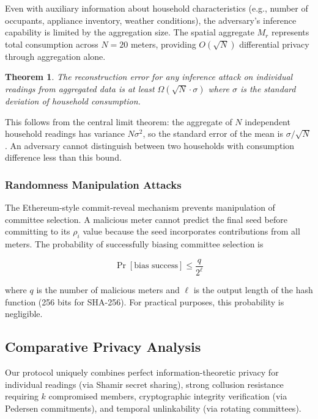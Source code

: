 \documentclass[conference]{IEEEtran}
\newtheorem{theorem}{Theorem}
\begin{document}
Even with auxiliary information about household characteristics (e.g., number of occupants, appliance inventory, weather conditions), the adversary's inference capability is limited by the aggregation size. The spatial aggregate \(M_r\) represents total consumption across \(N = 20\) meters, providing \(O(\sqrt{N})\) differential privacy through aggregation alone.

\begin{theorem}
The reconstruction error for any inference attack on individual readings from aggregated data is at least \(\Omega(\sqrt{N} \cdot \sigma)\) where \(\sigma\) is the standard deviation of household consumption.
\end{theorem}

This follows from the central limit theorem: the aggregate of \(N\) independent household readings has variance \(N\sigma^2\), so the standard error of the mean is \(\sigma/\sqrt{N}\). An adversary cannot distinguish between two households with consumption difference less than this bound.

\subsubsection{Randomness Manipulation Attacks}

The Ethereum-style commit-reveal mechanism prevents manipulation of committee selection. A malicious meter cannot predict the final seed before committing to its \(\rho_i\) value because the seed incorporates contributions from all meters. The probability of successfully biasing committee selection is

\begin{equation}
\Pr[\text{bias success}] \leq \frac{q}{2^{\ell}}
\end{equation}

where \(q\) is the number of malicious meters and \(\ell\) is the output length of the hash function (256 bits for SHA-256). For practical purposes, this probability is negligible.

\subsection{Comparative Privacy Analysis}

Our protocol uniquely combines perfect information-theoretic privacy for individual readings (via Shamir secret sharing), strong collusion resistance requiring \(k\) compromised members, cryptographic integrity verification (via Pedersen commitments), and temporal unlinkability (via rotating committees).
\end{document}
